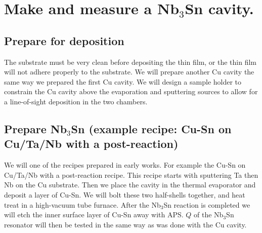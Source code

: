     \section{Make and measure a Nb$_3$Sn cavity.}

        \subsection{Prepare for deposition}

        The substrate must be very clean before depositing the thin film, or the thin film will not adhere properly to the substrate. We will prepare another Cu cavity the same way we prepared the first Cu cavity. We will design a sample holder to constrain the Cu cavity above the evaporation and sputtering sources to allow for a line-of-sight deposition in the two chambers.
        

            
        \subsection{Prepare Nb$_3$Sn (example recipe: Cu-Sn on Cu/Ta/Nb with a post-reaction)}

        We will one of the recipes prepared in early works. For example the Cu-Sn on Cu/Ta/Nb with a post-reaction recipe. This recipe starts with sputtering Ta then Nb on the Cu substrate. Then we place the cavity in the thermal evaporator and deposit a layer of Cu-Sn. We will bolt these two half-shells together, and heat treat in a high-vacuum tube furnace. After the Nb$_3$Sn reaction is completed we will etch the inner surface layer of Cu-Sn away with APS. $Q$ of the Nb$_3$Sn resonator will then be tested in the same way as was done with the Cu cavity.
        

